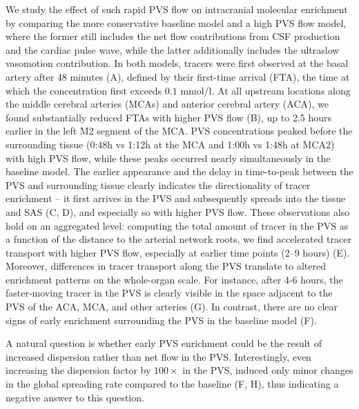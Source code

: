 \documentclass[fleqn,10pt]{wlscirep}
\begin{document}
We study the effect of such rapid PVS flow on intracranial molecular
enrichment by comparing the more conservative baseline model and a
high PVS flow model, where the former still includes the net flow
contributions from CSF production and the cardiac pulse wave, while
the latter additionally includes the ultraslow vasomotion
contribution. In both models, tracers were first observed at the basal
artery after 48 minutes (A), defined by their first-time arrival (FTA), the time at which the concentration first exceeds $0.1$ mmol/l. At all upstream locations along the middle cerebral arteries
(MCAs) and anterior cerebral artery (ACA), we found substantially
reduced FTAs with higher PVS flow (B), up to 2.5 hours
earlier in the left M2 segment of the MCA. PVS concentrations peaked
before the surrounding tissue (0:48h vs 1:12h at the MCA and 1:00h vs
1:48h at MCA2) with high PVS flow, while these peaks occurred nearly
simultaneously in the baseline model. The earlier appearance and the
delay in time-to-peak between the PVS and surrounding tissue clearly
indicates the directionality of tracer enrichment -- it first arrives
in the PVS and subsequently spreads into the tissue and SAS
(C, D), and especially so with higher PVS flow. These
observations also hold on an aggregated level: computing the total
amount of tracer in the PVS as a function of the distance to the
arterial network roots, we find accelerated tracer transport with
higher PVS flow, especially at earlier time points (2--9 hours)
(E). Moreover, differences in tracer transport along the
PVS translate to altered enrichment patterns on the whole-organ
scale. For instance, after 4-6 hours, the faster-moving tracer in the
PVS is clearly visible in the space adjacent to the PVS of the ACA, MCA, and other arteries (G). In contrast,
there are no clear signs of early enrichment surrounding the PVS in
the baseline model (F).

A natural question is whether early PVS enrichment could be the result
of increased dispersion rather than net flow in the
PVS\cite{asgari2016glymphatic,sharp2019dispersion,bojarskaite2023sleep,asgari2016glymphatic,troyetsky2021dispersion}. Interestingly,
even increasing the dispersion factor by $100 \times$ in the PVS,
induced only minor changes in the global spreading rate compared to the
baseline (F, H), thus indicating a negative answer to
this question.
\end{document}
